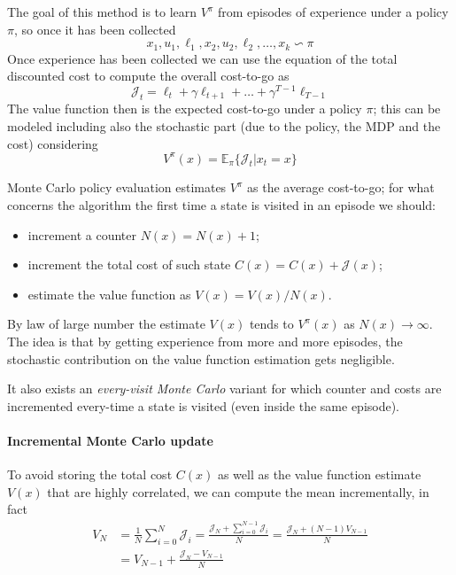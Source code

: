	The goal of this method is to learn $V^\pi$ from episodes of experience under a policy $\pi$, so once it has been collected
	\[ x_1, u_1, \ell_1, x_2, u_2, \ell_2,\dots, x_k \backsim \pi \]
	Once experience has been collected we can use the equation of the total discounted cost to compute the overall cost-to-go as
	\[ \mathcal J_t = \ell_t + \gamma \ell_{t+1} + \dots + \gamma^{T-1} \ell_{T-1} \]
	The value function then is the expected cost-to-go under a policy $\pi$; this can be modeled including also the stochastic part (due to the policy, the MDP and the cost) considering
	\begin{equation}
		V^\pi(x) = \mathbb E_\pi \big\{ \mathcal J_t | x_t = x\big\}
	\end{equation}

	Monte Carlo policy evaluation estimates $V^\pi$ as the average cost-to-go; for what concerns the algorithm the first time a state is visited in an episode we should:
	\begin{itemize}
		\item increment a counter $N(x) = N(x) + 1$;
		\item increment the total cost of such state $C(x) = C(x) + \mathcal J(x)$;
		\item estimate the value function as $V(x) = V(x) / N(x)$.
	\end{itemize}

	By law of large number the estimate $V(x)$ tends to $V^\pi(x)$ as $N(x) \rightarrow \infty$. The idea is that by getting experience from more and more episodes, the stochastic contribution on the value function estimation gets negligible.
	
	It also exists an \textit{every-visit Monte Carlo} variant for which counter and costs are incremented every-time a state is visited (even inside the same episode).
	
	\paragraph{Incremental Monte Carlo update} To avoid storing the total cost $C(x)$ as well as the value function estimate $V(x)$ that are highly correlated, we can compute the mean incrementally, in fact
	\begin{align*}
		V_N & = \frac 1N \sum_{i=0}^N \mathcal J_i = \frac{\mathcal J_N + \sum_{i=0}^{N-1} \mathcal J_i}{N} = \frac{\mathcal J_N + (N-1) V_{N-1}}{N} \\
		& = V_{N-1} + \frac{\mathcal J_N - V_{N-1}}{N}
	\end{align*}	
	

